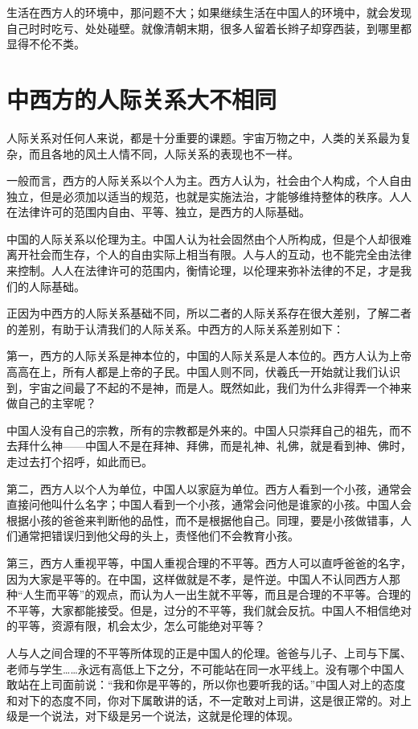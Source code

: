 \documentclass[fontset=fandol, a4paper, 12pt, openright]{ctexbook}
\begin{document}
生活在西方人的环境中，那问题不大；如果继续生活在中国人的环境中，就会发现自己时时吃亏、处处碰壁。就像清朝末期，很多人留着长辫子却穿西装，到哪里都显得不伦不类。

\section{中西方的人际关系大不相同}

人际关系对任何人来说，都是十分重要的课题。宇宙万物之中，人类的关系最为复杂，而且各地的风土人情不同，人际关系的表现也不一样。

一般而言，西方的人际关系以个人为主。西方人认为，社会由个人构成，个人自由独立，但是必须加以适当的规范，也就是实施法治，才能够维持整体的秩序。人人在法律许可的范围内自由、平等、独立，是西方的人际基础。

中国的人际关系以伦理为主。中国人认为社会固然由个人所构成，但是个人却很难离开社会而生存，个人的自由实际上相当有限。人与人的互动，也不能完全由法律来控制。人人在法律许可的范围内，衡情论理，以伦理来弥补法律的不足，才是我们的人际基础。

正因为中西方的人际关系基础不同，所以二者的人际关系存在很大差别，了解二者的差别，有助于认清我们的人际关系。中西方的人际关系差别如下：

第一，西方的人际关系是神本位的，中国的人际关系是人本位的。西方人认为上帝高高在上，所有人都是上帝的子民。中国人则不同，伏羲氏一开始就让我们认识到，宇宙之间最了不起的不是神，而是人。既然如此，我们为什么非得弄一个神来做自己的主宰呢？

中国人没有自己的宗教，所有的宗教都是外来的。中国人只崇拜自己的祖先，而不去拜什么神——中国人不是在拜神、拜佛，而是礼神、礼佛，就是看到神、佛时，走过去打个招呼，如此而已。

第二，西方人以个人为单位，中国人以家庭为单位。西方人看到一个小孩，通常会直接问他叫什么名字；中国人看到一个小孩，通常会问他是谁家的小孩。中国人会根据小孩的爸爸来判断他的品性，而不是根据他自己。同理，要是小孩做错事，人们通常把错误归到他父母的头上，责怪他们不会教育小孩。

第三，西方人重视平等，中国人重视合理的不平等。西方人可以直呼爸爸的名字，因为大家是平等的。在中国，这样做就是不孝，是忤逆。中国人不认同西方人那种“人生而平等”的观点，而认为人一出生就不平等，而且是合理的不平等。合理的不平等，大家都能接受。但是，过分的不平等，我们就会反抗。中国人不相信绝对的平等，资源有限，机会太少，怎么可能绝对平等？

人与人之间合理的不平等所体现的正是中国人的伦理。爸爸与儿子、上司与下属、老师与学生……永远有高低上下之分，不可能站在同一水平线上。没有哪个中国人敢站在上司面前说：“我和你是平等的，所以你也要听我的话。”中国人对上的态度和对下的态度不同，你对下属敢讲的话，不一定敢对上司讲，这是很正常的。对上级是一个说法，对下级是另一个说法，这就是伦理的体现。
\end{document}
